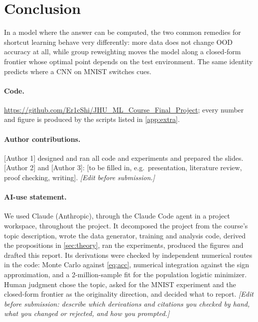 \documentclass{article}
\begin{document}
\section{Conclusion}
In a model where the answer can be computed, the two common remedies for shortcut learning behave
very differently: more data does not change OOD accuracy at all, while group reweighting moves the
model along a closed-form frontier whose optimal point depends on the test environment. The same
identity predicts where a CNN on MNIST switches cues.

\paragraph{Code.} \url{https://github.com/Er1cShi/JHU_ML_Course_Final_Project}; every number and
figure is produced by the scripts listed in \cref{app:extra}.

\paragraph{Author contributions.} [Author 1] designed and ran all code and experiments and prepared the
slides. [Author 2] and [Author 3]: [to be filled in, e.g.\ presentation, literature
review, proof checking, writing]. \textit{[Edit before submission.]}

\paragraph{AI-use statement.} We used Claude (Anthropic), through the Claude Code agent in a project
workspace, throughout the project. It decomposed the project from the course's topic description,
wrote the data generator, training and analysis code, derived the propositions in
\cref{sec:theory}, ran the experiments, produced the figures and drafted this report. Its
derivations were checked by independent numerical routes in the code: Monte Carlo against
\eqref{eq:acc}, numerical integration against the sign approximation, and a 2-million-sample fit for
the population logistic minimizer. Human judgment chose the topic, asked for the MNIST experiment
and the closed-form frontier as the originality direction, and decided what to report.
\textit{[Edit before submission: describe which derivations and citations you checked by hand,
what you changed or rejected, and how you prompted.]}

{\small


}

\newpage
\appendix
\end{document}
